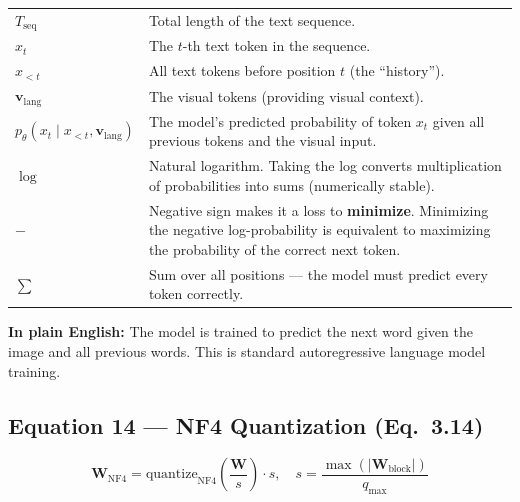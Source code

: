 \documentclass[12pt, a4paper]{article}
\begin{document}
\begin{explainbox}
\begin{tabular}{lp{11cm}}
$T_{\text{seq}}$ & Total length of the text sequence.\\[0.2cm]
$x_t$ & The $t$-th text token in the sequence.\\[0.2cm]
$x_{<t}$ & All text tokens before position $t$ (the ``history'').\\[0.2cm]
$\mathbf{v}_{\text{lang}}$ & The visual tokens (providing visual context).\\[0.2cm]
$p_\theta(x_t \mid x_{<t}, \mathbf{v}_{\text{lang}})$ & The model's predicted probability of token $x_t$ given all previous tokens and the visual input.\\[0.2cm]
$\log$ & Natural logarithm. Taking the log converts multiplication of probabilities into sums (numerically stable).\\[0.2cm]
$-$ & Negative sign makes it a loss to \textbf{minimize}. Minimizing the negative log-probability is equivalent to maximizing the probability of the correct next token.\\[0.2cm]
$\sum$ & Sum over all positions --- the model must predict every token correctly.
\end{tabular}

\textbf{In plain English:} The model is trained to predict the next word given the image and all previous words. This is standard autoregressive language model training.
\end{explainbox}


\subsection{Equation 14 --- NF4 Quantization (Eq.~3.14)}

\begin{eqbox}
\[
\mathbf{W}_{\text{NF4}} = \text{quantize}_{\text{NF4}}\!\left(\frac{\mathbf{W}}{s}\right) \cdot s, \quad s = \frac{\max(|\mathbf{W}_{\text{block}}|)}{q_{\max}}
\]
\end{eqbox}
\end{document}
